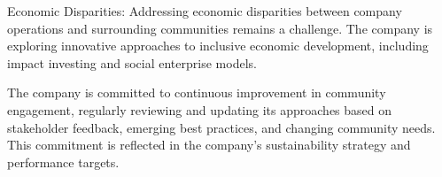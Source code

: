 Economic Disparities: Addressing economic disparities between company operations and surrounding communities remains a challenge. The company is exploring innovative approaches to inclusive economic development, including impact investing and social enterprise models.

The company is committed to continuous improvement in community engagement, regularly reviewing and updating its approaches based on stakeholder feedback, emerging best practices, and changing community needs. This commitment is reflected in the company's sustainability strategy and performance targets.